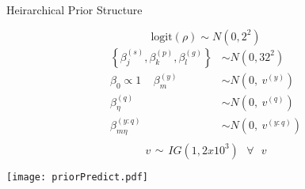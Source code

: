 \documentclass[ xcolor = pdftex, dvipsnames, table ]{beamer}
\begin{document}
%
\begin{frame}{Heirarchical Prior Structure}
$~$
\hspace{-0.8cm}
\begin{minipage}{0.55\textwidth}
\begin{equation*}
\text{logit}(\rho) \sim N(0, 2^2)
\end{equation*}
\begin{align*}
\left\{\beta^{(s)}_j, \beta^{(p)}_k, \beta^{(g)}_l\right\} &\sim N(0, 32^2)\\
\beta_0 \propto 1 ~~~~~ \beta^{(y)}_m &\sim N\left(0,~{v}^{(y)}\right)\\
\beta^{(q)}_\eta &\sim N\left(0,~{v}^{(q)}\right)\\
\beta^{(y:q)}_{m\eta} &\sim N\left(0,~{v}^{(y:q)}\right)\\
\end{align*}
\vspace{-1cm}
\begin{equation*}
v\substack{\sim} IG(1, 2x10^{3}) ~~~\forall~~~v 
\end{equation*}
\end{minipage}
\begin{minipage}{0.4\textwidth}       
        \texttt{[image: priorPredict.pdf]}
\end{minipage}
\end{frame}
\end{document}
